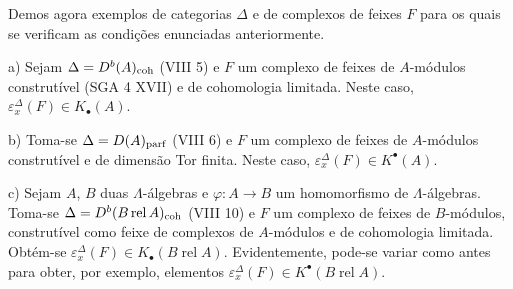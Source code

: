 Demos agora exemplos de categorias $\Delta$ e de complexos de feixes $F$ para os quais se verificam as condições enunciadas anteriormente.

a) Sejam $\Delta=D^b(A)_{\mathrm{coh}}$ (VIII 5) e $F$ um complexo de feixes de $A$-módulos construtível (SGA 4 XVII) e de cohomologia limitada. Neste caso, $\varepsilon_x^\Delta(F)\in K_\bullet(A)$.

b) Toma-se $\Delta=D(A)_{\mathrm{parf}}$ (VIII 6) e $F$ um complexo de feixes de $A$-módulos construtível e de dimensão Tor finita. Neste caso, $\varepsilon_x^\Delta(F)\in K^{\bullet}(A)$.

c) Sejam $A$, $B$ duas $\Lambda$-álgebras e $\varphi:A\to B$ um homomorfismo de $\Lambda$-álgebras. Toma-se $\Delta=D^b(B\operatorname{ rel }A)_{\mathrm{coh}}$ (VIII 10) e $F$ um complexo de feixes de $B$-módulos, construtível como feixe de complexos de $A$-módulos e de cohomologia limitada. Obtém-se $\varepsilon_x^\Delta(F)\in K_\bullet(B\operatorname{ rel }A)$. Evidentemente, pode-se variar como antes para obter, por exemplo, elementos $\varepsilon_x^\Delta(F)\in K^{\bullet}(B\operatorname{ rel }A)$.
